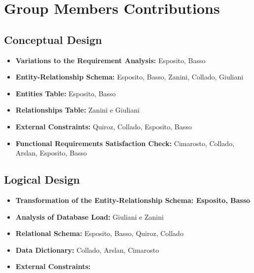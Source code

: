 \section{Group Members Contributions}


\subsection{Conceptual Design}
\begin{itemize}
	\item \textbf{Variations to the Requirement Analysis:} Esposito, Basso
	\item \textbf{Entity-Relationship Schema:} Esposito, Basso, Zanini, Collado, Giuliani 
	\item \textbf{Entities Table:} Esposito, Basso
	\item \textbf{Relationships Table:} Zanini e Giuliani
	\item \textbf{External Constraints:} Quiroz, Collado, Esposito, Basso
	\item \textbf{Functional Requirements Satisfaction Check:} Cimarosto, Collado, Arslan, Esposito, Basso
\end{itemize}

\subsection{Logical Design}
\begin{itemize}
	\item \textbf{Transformation of the Entity-Relationship Schema: Esposito, Basso} 
	\item \textbf{Analysis of Database Load:} Giuliani e Zanini
	\item \textbf{Relational Schema:} Esposito, Basso, Quiroz, Collado
	\item \textbf{Data Dictionary:} Collado, Arslan, Cimarosto
	\item \textbf{External Constraints:}
\end{itemize}	